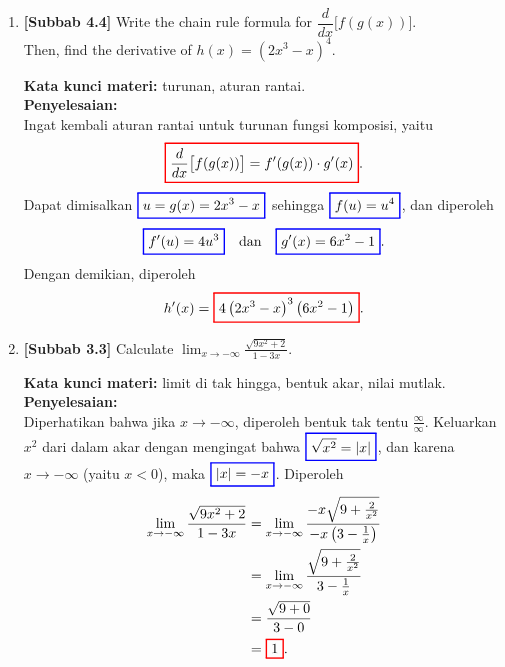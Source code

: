 \documentclass[10pt,openany,a4paper]{article}
\theoremstyle{definition}
\theoremstyle{definition}
\theoremstyle{plain}
\newenvironment{jawab}[2][tes]{%
\par\noindent\textbf{Kata kunci materi:} #1.\\
\textbf{Penyelesaian:} #2%
}{}
\begin{document}
\begin{enumerate}
    \item \textbf{[Subbab 4.4]} Write the chain rule formula for $\dfrac{d}{dx}\big[f(g(x))\big]$.\\
    Then, find the derivative of $h(x)=\left(2x^3-x\right)^4$.
    \begin{jawab}[turunan, aturan rantai]{~\\
        Ingat kembali aturan rantai untuk turunan fungsi komposisi, yaitu
        \[
        \colorlet{oldcolor}{.}
        \color{red}
        \setlength{\fboxrule}{1pt} \boxed{\color{oldcolor}\frac{d}{dx}\big[f(g(x))\big] = f'(g(x)) \cdot g'(x)}\color{oldcolor}.
        \]
        Dapat dimisalkan $\colorlet{oldcolor}{.}
        \color{blue}
        \setlength{\fboxrule}{1pt} \boxed{\color{oldcolor}u=g(x)=2x^3-x}\color{oldcolor}$ sehingga $\colorlet{oldcolor}{.}
        \color{blue}
        \setlength{\fboxrule}{1pt} \boxed{\color{oldcolor}f(u)=u^4}\color{oldcolor}$, dan diperoleh
        \begin{align*}
            \colorlet{oldcolor}{.}
        \color{blue}
        \setlength{\fboxrule}{1pt} \boxed{\color{oldcolor}f'(u)=4u^3}\color{oldcolor} \quad\text{dan}\quad \colorlet{oldcolor}{.}
        \color{blue}
        \setlength{\fboxrule}{1pt} \boxed{\color{oldcolor}g'(x)=6x^2-1}\color{oldcolor}.
        \end{align*}
        Dengan demikian, diperoleh
        \begin{align*}
            h'(x) = \colorlet{oldcolor}{.}
        \color{red}
        \setlength{\fboxrule}{1pt} \boxed{\color{oldcolor}4\left(2x^3-x\right)^3\left(6x^2-1\right)}\color{oldcolor}.
        \end{align*}
    }
    \end{jawab}

    \item \textbf{[Subbab 3.3]} Calculate $\displaystyle\lim_{x\to-\infty}\frac{\sqrt{9x^2+2}}{1-3x}$.
    \begin{jawab}[limit di tak hingga, bentuk akar, nilai mutlak]{~\\
        Diperhatikan bahwa jika $x\to-\infty$, diperoleh bentuk tak tentu $\frac{\infty}{\infty}$. Keluarkan $x^2$ dari dalam akar dengan mengingat bahwa $\colorlet{oldcolor}{.}
        \color{blue}
        \setlength{\fboxrule}{1pt} \boxed{\color{oldcolor}\sqrt{x^2}=|x|}\color{oldcolor}$, dan karena $x\to-\infty$ (yaitu $x<0$), maka $\colorlet{oldcolor}{.}
        \color{blue}
        \setlength{\fboxrule}{1pt} \boxed{\color{oldcolor}|x|=-x}\color{oldcolor}$. Diperoleh
        \begin{align*}
            \lim_{x\to-\infty}\frac{\sqrt{9x^2+2}}{1-3x} &= \lim_{x\to-\infty}\frac{-x\sqrt{9+\frac{2}{x^2}}}{-x\left(3-\frac{1}{x}\right)}\\
            &= \lim_{x\to-\infty}\frac{\sqrt{9+\frac{2}{x^2}}}{3-\frac{1}{x}}\\
            &= \frac{\sqrt{9+0}}{3-0}\\
            &= \colorlet{oldcolor}{.}
        \color{red}
        \setlength{\fboxrule}{1pt} \boxed{\color{oldcolor}1}\color{oldcolor}.
        \end{align*}
    }
    \end{jawab}


\end{enumerate}
\end{document}
